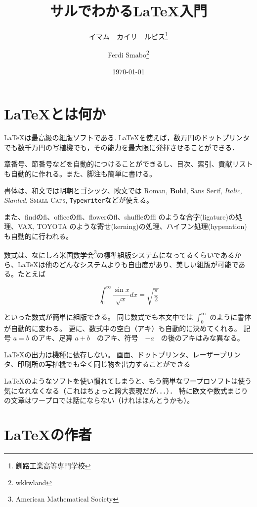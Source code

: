 \documentclass[a4j]{jarticle}
\begin{document}
\title{サルでわかる\LaTeX 入門}
\author{イマム　カイリ　ルビス\thanks{釧路工業高等専門学校}\and Ferdi Smabo\thanks{wkkwland}}
\date{ \today}

\maketitle

\section{\LaTeX とは何か}

\LaTeX は最高級の組版ソフトである. \LaTeX を使えば，数万円のドットプリンタでも数千万円の写植機でも，その能力を最大限に発揮させることができる．

章番号、節番号などを自動的につけることができるし、目次、索引、貢献リストも自動的に作れる。また、脚注も簡単に書ける。

書体は、和文では明朝とゴシック、欧文では Roman, \textbf{Bold}, \textsf{Sans Serif}, \textit{Italic}, \textsl{Slanted}, \textsc{Small Caps}, \texttt{Typewriter}などが使える。

また、findのfi、officeのffi、flowerのfl、shuffleのffl のような合字(ligature)の処理、VAX, TOYOTA のような寄せ(kerning)の処理、ハイフン処理(hypenation)も自動的に行われる。

数式は、なにしろ米国数学会\footnote{American Mathematical Society}の標準組版システム\cite{Rate06}になってるくらいであるから、\LaTeX は他のどんなシステムよりも自由度があり、美しい組版が可能である。たとえば

\[\int_0^\infty \frac{\sin{x}}{\sqrt{x}}dx
	= \sqrt{\frac{\pi}{2}}\]

といった数式が簡単に組版できる。
同じ数式でも本文中では $\int_0^\infty$ のように書体が自動的に変わる。
更に、数式中の空白（アキ）も自動的に決めてくれる。
記号 $a=b$ のアキ、足算 $a+b$　のアキ、符号　$-a$　の後のアキはみな異なる。

\LaTeX の出力は機種に依存しない。
画面、ドットプリンタ、レーザープリンタ、印刷所の写植機でも全く同じ物を出力することができる\cite{HM99}

\LaTeX のようなソフトを使い慣れてしまうと、もう簡単なワープロソフトは使う気になれなくなる（これはちょっと誇大表現だが．．．）．
特に欧文や数式まじりの文章はワープロでは話にならない（けれはほんとうかも）。

\section{\LaTeX の作者}
\end{document}
